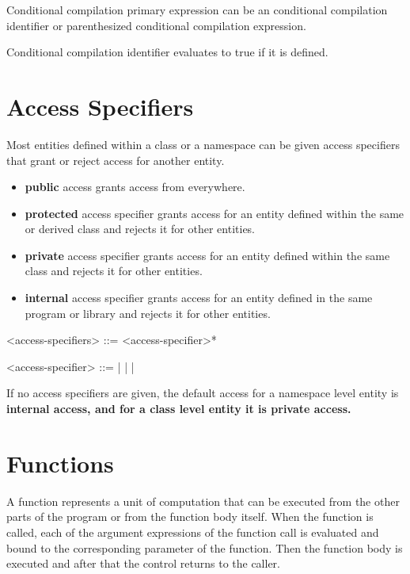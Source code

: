 \documentclass[a4paper,oneside,11pt]{article}
\begin{document}
Conditional compilation primary expression can be an conditional compilation identifier or
parenthesized conditional compilation expression.

Conditional compilation identifier evaluates to true if it is defined.

\section{Access Specifiers}

Most entities defined within a class or a namespace can be given access specifiers that grant or reject access for another entity.

\begin{itemize}
\item{\bf{public}} access grants access from everywhere.

\item{\bf{protected}} access specifier grants access for an entity defined within the same or derived class and rejects it for other entities.

\item{\bf{private}} access specifier grants access for an entity defined within the same class and rejects it for other entities.

\item{\bf{internal}} access specifier grants access for an entity defined in the same program or library and rejects it for other entities.
\end{itemize}

\begin{grammar}
\label{access-specifiers}<access-specifiers> ::= <access-specifier>*

\label{access-specifier}<access-specifier> ::=  |  |  | 
\end{grammar}

If no access specifiers are given, the default access for a namespace level entity is \bf{internal} access, and for a class level entity it is \bf{private} access.

\section{Functions}

A function represents a unit of computation that can be executed from the other parts of the program or from the function body itself.
When the function is called, each of the argument expressions of the function call is evaluated and bound to the corresponding parameter of the function.
Then the function body is executed and after that the control returns to the caller.
\end{document}
